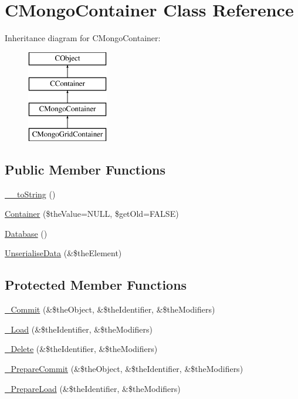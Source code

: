\hypertarget{class_c_mongo_container}{\section{C\-Mongo\-Container Class Reference}
\label{class_c_mongo_container}
}
Inheritance diagram for C\-Mongo\-Container\-:\begin{figure}[H]
\begin{center}
\leavevmode
\includegraphics[height=4.000000cm]{class_c_mongo_container}
\end{center}
\end{figure}
\subsection*{Public Member Functions}
\begin{DoxyCompactItemize}
\item 
\hyperlink{class_c_mongo_container_abc325eae251667da577efdb45a7d3c17}{\-\_\-\-\_\-to\-String} ()
\item 
\hyperlink{class_c_mongo_container_a253978bb8e4d1e2613665d308de83e1e}{Container} (\$the\-Value=N\-U\-L\-L, \$get\-Old=F\-A\-L\-S\-E)
\item 
\hyperlink{class_c_mongo_container_a27a99b6ea891b226729bc6cb8426cac0}{Database} ()
\item 
\hyperlink{class_c_mongo_container_a077bdbf148dfa01f3798015906e4e70a}{Unserialise\-Data} (\&\$the\-Element)
\end{DoxyCompactItemize}
\subsection*{Protected Member Functions}
\begin{DoxyCompactItemize}
\item 
\hyperlink{class_c_mongo_container_a92cbcdba4f2b0bda2ae3eeb7a08d7ba2}{\-\_\-\-Commit} (\&\$the\-Object, \&\$the\-Identifier, \&\$the\-Modifiers)
\item 
\hyperlink{class_c_mongo_container_a61f469d1975834b22665392542620317}{\-\_\-\-Load} (\&\$the\-Identifier, \&\$the\-Modifiers)
\item 
\hyperlink{class_c_mongo_container_aa516a049efe0c9083e2f8c5b9f9076a4}{\-\_\-\-Delete} (\&\$the\-Identifier, \&\$the\-Modifiers)
\item 
\hyperlink{class_c_mongo_container_af592e4500a640190f374c18683af3b83}{\-\_\-\-Prepare\-Commit} (\&\$the\-Object, \&\$the\-Identifier, \&\$the\-Modifiers)
\item 
\hyperlink{class_c_mongo_container_a2c44e9229169abde420adf34045f5382}{\-\_\-\-Prepare\-Load} (\&\$the\-Identifier, \&\$the\-Modifiers)
\end{DoxyCompactItemize}
